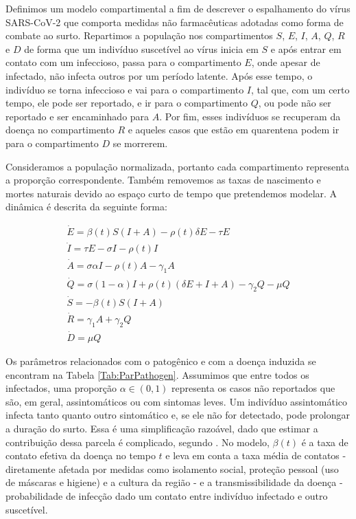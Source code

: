 Definimos um modelo compartimental \cite{aronna2021} a fim de descrever o espalhamento do vírus SARS-CoV-2 que comporta medidas não farmacêuticas  adotadas como forma de combate ao surto. 
Repartimos a população nos compartimentos $S$, $E$, $I$, $A$, $Q$, $R$ e $D$ de forma que um indivíduo suscetível ao vírus inicia em $S$ e após entrar em contato com um infeccioso, passa para o compartimento $E$, onde apesar de infectado, não infecta outros por um período latente.
Após esse tempo, o indivíduo se torna infeccioso e vai para o compartimento $I$, tal que, com um certo tempo, ele pode ser reportado, e ir para o compartimento $Q$, ou pode não ser reportado e ser encaminhado para $A$. 
Por fim, esses indivíduos se recuperam da doença no compartimento $R$ e aqueles casos que estão em quarentena podem ir para o compartimento $D$ se morrerem. 

Consideramos a população normalizada, portanto cada compartimento representa a proporção correspondente. 
Também removemos as taxas de nascimento e mortes naturais devido ao espaço curto de tempo que pretendemos modelar. 
A dinâmica é descrita da seguinte forma: 

\begin{equation}\label{eq:SEIRwQ}
    \begin{array}{l}
        \Dot{E} = \beta(t) S (I + A) - \rho(t) \delta E - \tau E \\[0.5ex]
        \Dot{I} = \tau E - \sigma I - \rho(t) I \\[0.5ex]
        \Dot{A} = \sigma\alpha I - \rho(t) A - \gamma_1 A \\[0.5ex]
        \Dot{Q} = \sigma (1-\alpha) I  + \rho(t) (\delta E + I + A) - \gamma_2 Q - \mu Q \\[0.5ex]
        \Dot{S} = -\beta(t) S (I + A) \\[0.5ex]
        \Dot{R} = \gamma_1 A + \gamma_2 Q\\[0.5ex]
        \Dot{D} = \mu Q
    \end{array}
\end{equation}

Os parâmetros relacionados com o patogênico e com a doença induzida se
encontram na Tabela \ref{Tab:ParPathogen}. 
Assumimos que entre todos os infectados, uma proporção $\alpha \in (0,1)$ representa os casos não reportados que são, em geral, assintomáticos ou com sintomas leves. 
Um indivíduo assintomático infecta tanto quanto outro sintomático e, se ele não for detectado, pode prolongar a duração do surto. 
Essa é uma simplificação razoável, dado que estimar a contribuição
dessa parcela é complicado, segundo \cite{nogrady}. 
No modelo, $\beta(t)$ é a taxa de contato efetiva da doença no tempo $t$ e leva em conta a taxa média de contatos - diretamente afetada por medidas como isolamento social, proteção pessoal (uso de máscaras e higiene) e a cultura da região - e a transmissibilidade da doença - probabilidade de infecção dado um contato entre indivíduo infectado e outro suscetível. 

